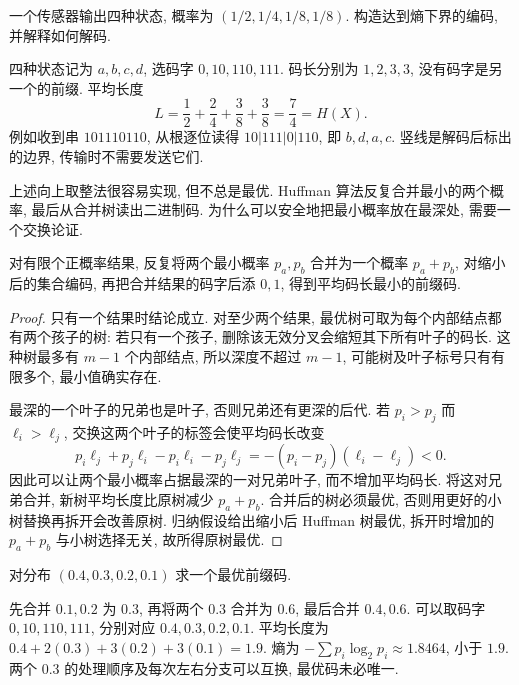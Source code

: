 \begin{example}
一个传感器输出四种状态, 概率为 $(1/2,1/4,1/8,1/8)$. 构造达到熵下界的编码, 并解释如何解码.
\end{example}
\begin{solution}
四种状态记为 $a,b,c,d$, 选码字 $0,10,110,111$. 码长分别为 $1,2,3,3$, 没有码字是另一个的前缀. 平均长度
\[
 L=\frac12+\frac24+\frac38+\frac38=\frac74=H(X).
\]
例如收到串 $101110110$, 从根逐位读得 $10|111|0|110$, 即 $b,d,a,c$. 竖线是解码后标出的边界, 传输时不需要发送它们.
\end{solution}

上述向上取整法很容易实现, 但不总是最优. Huffman 算法反复合并最小的两个概率, 最后从合并树读出二进制码. 为什么可以安全地把最小概率放在最深处, 需要一个交换论证.

\begin{proposition}
对有限个正概率结果, 反复将两个最小概率 $p_a,p_b$ 合并为一个概率 $p_a+p_b$, 对缩小后的集合编码, 再把合并结果的码字后添 $0,1$, 得到平均码长最小的前缀码.
\end{proposition}
\begin{proof}
只有一个结果时结论成立. 对至少两个结果, 最优树可取为每个内部结点都有两个孩子的树: 若只有一个孩子, 删除该无效分叉会缩短其下所有叶子的码长. 这种树最多有 $m-1$ 个内部结点, 所以深度不超过 $m-1$, 可能树及叶子标号只有有限多个, 最小值确实存在.

最深的一个叶子的兄弟也是叶子, 否则兄弟还有更深的后代. 若 $p_i>p_j$ 而 $\ell_i>\ell_j$, 交换这两个叶子的标签会使平均码长改变
\[
 p_i\ell_j+p_j\ell_i-p_i\ell_i-p_j\ell_j
 =-(p_i-p_j)(\ell_i-\ell_j)<0.
\]
因此可以让两个最小概率占据最深的一对兄弟叶子, 而不增加平均码长. 将这对兄弟合并, 新树平均长度比原树减少 $p_a+p_b$. 合并后的树必须最优, 否则用更好的小树替换再拆开会改善原树. 归纳假设给出缩小后 Huffman 树最优, 拆开时增加的 $p_a+p_b$ 与小树选择无关, 故所得原树最优.
\end{proof}

\begin{example}
对分布 $(0.4,0.3,0.2,0.1)$ 求一个最优前缀码.
\end{example}
\begin{solution}
先合并 $0.1,0.2$ 为 $0.3$, 再将两个 $0.3$ 合并为 $0.6$, 最后合并 $0.4,0.6$. 可以取码字 $0,10,110,111$, 分别对应 $0.4,0.3,0.2,0.1$. 平均长度为
$0.4+2(0.3)+3(0.2)+3(0.1)=1.9$.
熵为 $-\sum p_i\log_2p_i\approx1.8464$, 小于 $1.9$. 两个 $0.3$ 的处理顺序及每次左右分支可以互换, 最优码未必唯一.
\end{solution}


